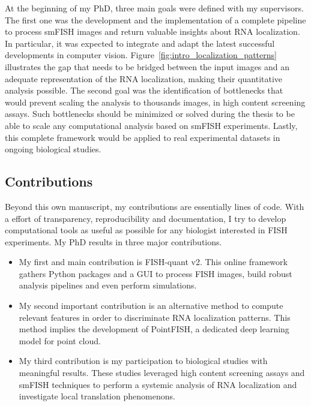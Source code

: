 At the beginning of my PhD, three main goals were defined with my supervisors.
The first one was the development and the implementation of a complete pipeline to process \ac{smFISH} images and return valuable insights about \ac{RNA} localization.
In particular, it was expected to integrate and adapt the latest successful developments in computer vision.
Figure~\ref{fig:intro_localization_patterns} illustrates the gap that needs to be bridged between the input images and an adequate representation of the \ac{RNA} localization, making their quantitative analysis possible.
The second goal was the identification of bottlenecks that would prevent scaling the analysis to thousands images, in high content screening assays.
Such bottlenecks should be minimized or solved during the thesis to be able to scale any computational analysis based on \ac{smFISH} experiments.
Lastly, this complete framework would be applied to real experimental datasets in ongoing biological studies.

\subsection{Contributions}
\label{subsec:intro_contributions}

Beyond this own manuscript, my contributions are essentially lines of code.
With a effort of transparency, reproducibility and documentation, I try to develop computational tools as useful as possible for any biologist interested in \ac{FISH} experiments.
My PhD results in three major contributions.

\begin{itemize}
	\setlength\itemsep{0.1em}
	\item My first and main contribution is FISH-quant v2.
	This online framework gathers Python packages and a \ac{GUI} to process \ac{FISH} images, build robust analysis pipelines and even perform simulations.
	\item My second important contribution is an alternative method to compute relevant features in order to discriminate \ac{RNA} localization patterns.
	This method implies the development of PointFISH, a dedicated deep learning model for point cloud.
	\item My third contribution is my participation to biological studies with meaningful results.
	These studies leveraged high content screening assays and \ac{smFISH} techniques to perform a systemic analysis of \ac{RNA} localization and investigate local translation phenomenons.
\end{itemize}

